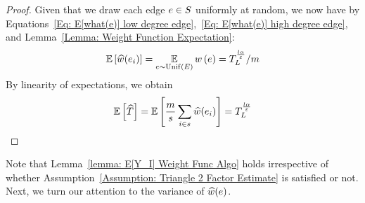 \begin{lemma}
\begin{proof}
    Given that we draw each edge $e \in S$ uniformly at random, we now have by Equations~\ref{Eq: E[what(e)] low degree edge},~\ref{Eq: E[what(e)] high degree edge}, and Lemma~\ref{Lemma: Weight Function Expectation}:
    \begin{align*}
        \operatorname*{\mathbb{E}}\left[{\widehat{w}(e_i)}\right] = \operatorname*{\mathbb{E}}_{e \sim \mathrm{Unif}\left({E}\right)} w\left({e}\right) = T^{\frac{l\alpha}{\varepsilon}}_{L}/m 
    \end{align*}
    By linearity of expectations, we obtain
    \begin{align*}
        \operatorname*{\mathbb{E}}\left[{\widehat{T}}\right] = \operatorname*{\mathbb{E}}\left[{\frac{m}{s}\sum_{i \in s} \widehat{w}(e_i)}\right] = T^{\frac{l\alpha}{\varepsilon}}_{L} 
    \end{align*}

    \end{proof}
\end{lemma}

Note that Lemma~\ref{lemma: E[Y_I] Weight Func Algo} holds irrespective of whether Assumption~\ref{Assumption: Triangle 2 Factor Estimate} is satisfied or not. Next, we turn our attention to the variance of $\widehat{w}(e)$.

